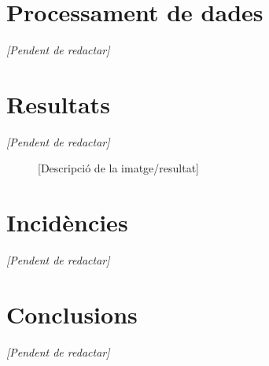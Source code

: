 \section{Processament de dades}
\textit{[Pendent de redactar]}

\section{Resultats}
\textit{[Pendent de redactar]}

\begin{figure}[H]
    \centering
    \caption{[Descripció de la imatge/resultat]}
    \label{fig:survey-exemple}
\end{figure}

\section{Incidències}
\textit{[Pendent de redactar]}

\section{Conclusions}
\textit{[Pendent de redactar]}
